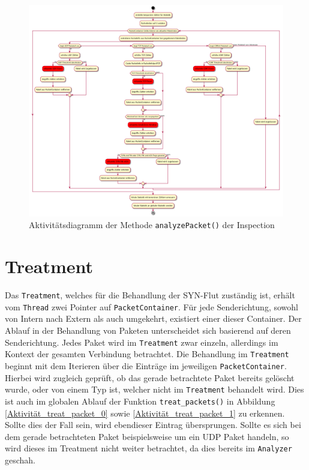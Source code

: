 \documentclass[../review_2.tex]{subfiles}
\begin{document}
\begin{figure}[h]
    \centering
    \includegraphics[angle=90, width=\linewidth]{img/inspection_ablauf.png}
    \caption{Aktivitätsdiagramm der Methode \texttt{analyzePacket()} der Inspection}
    \label{inspection_activity}
\end{figure}


\section{Treatment}

Das \texttt{Treatment}, welches für die Behandlung der SYN-Flut zuständig ist, erhält vom \texttt{Thread} zwei Pointer auf \texttt{PacketContainer}. Für jede Senderichtung, sowohl von Intern nach Extern als auch umgekehrt, existiert einer dieser Container. Der Ablauf in der Behandlung von Paketen unterscheidet sich basierend auf deren Senderichtung. Jedes Paket wird im \texttt{Treatment} zwar einzeln, allerdings im Kontext der gesamten Verbindung betrachtet. Die Behandlung im \texttt{Treatment} beginnt mit dem Iterieren über die Einträge im jeweiligen \texttt{PacketContainer}. Hierbei wird zugleich geprüft, ob das gerade betrachtete Paket bereits gelöscht wurde, oder von einem Typ ist, welcher nicht im \texttt{Treatment} behandelt wird. Dies ist auch im globalen Ablauf der Funktion \texttt{treat\_packets()} in Abbildung \ref{Aktivität_treat_packet_0} sowie \ref{Aktivität_treat_packet_1} zu erkennen. Sollte dies der Fall sein, wird ebendieser Eintrag übersprungen. Sollte es sich bei dem gerade betrachteten Paket beispielsweise um ein UDP Paket handeln, so wird dieses im Treatment nicht weiter betrachtet, da dies bereits im \texttt{Analyzer} geschah.
\end{document}
